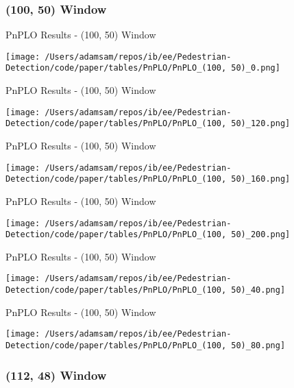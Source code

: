 
\subsubsection*{(100, 50) Window}

\begin{table}
    \caption{PnPLO Results - (100, 50) Window}
    \texttt{[image: /Users/adamsam/repos/ib/ee/Pedestrian-Detection/code/paper/tables/PnPLO/PnPLO\_(100, 50)\_0.png]}
    \label{tab:PnPLO_(100, 50)_0}
\end{table}

\begin{table}
    \caption{PnPLO Results - (100, 50) Window}
    \texttt{[image: /Users/adamsam/repos/ib/ee/Pedestrian-Detection/code/paper/tables/PnPLO/PnPLO\_(100, 50)\_120.png]}
    \label{tab:PnPLO_(100, 50)_120}
\end{table}

\begin{table}
    \caption{PnPLO Results - (100, 50) Window}
    \texttt{[image: /Users/adamsam/repos/ib/ee/Pedestrian-Detection/code/paper/tables/PnPLO/PnPLO\_(100, 50)\_160.png]}
    \label{tab:PnPLO_(100, 50)_160}
\end{table}

\begin{table}
    \caption{PnPLO Results - (100, 50) Window}
    \texttt{[image: /Users/adamsam/repos/ib/ee/Pedestrian-Detection/code/paper/tables/PnPLO/PnPLO\_(100, 50)\_200.png]}
    \label{tab:PnPLO_(100, 50)_200}
\end{table}

\begin{table}
    \caption{PnPLO Results - (100, 50) Window}
    \texttt{[image: /Users/adamsam/repos/ib/ee/Pedestrian-Detection/code/paper/tables/PnPLO/PnPLO\_(100, 50)\_40.png]}
    \label{tab:PnPLO_(100, 50)_40}
\end{table}

\begin{table}
    \caption{PnPLO Results - (100, 50) Window}
    \texttt{[image: /Users/adamsam/repos/ib/ee/Pedestrian-Detection/code/paper/tables/PnPLO/PnPLO\_(100, 50)\_80.png]}
    \label{tab:PnPLO_(100, 50)_80}
\end{table}

\subsubsection*{(112, 48) Window}

